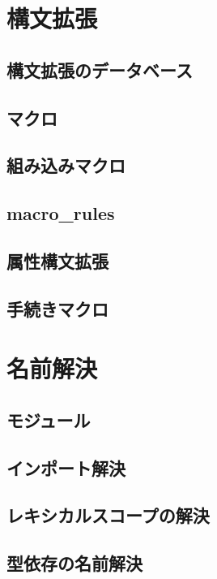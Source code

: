 \documentclass[dvipdfmx,uplatex,papersize,a4paper,10pt]{jsbook}
\theoremstyle{definition}
\begin{document}
\chapter{構文拡張}

\section{構文拡張のデータベース}

\section{マクロ}

\section{組み込みマクロ}

\section{macro\_rules}

\section{属性構文拡張}

\section{手続きマクロ}



\chapter{名前解決}

\section{モジュール}

\section{インポート解決}

\section{レキシカルスコープの解決}

\section{型依存の名前解決}
\end{document}
